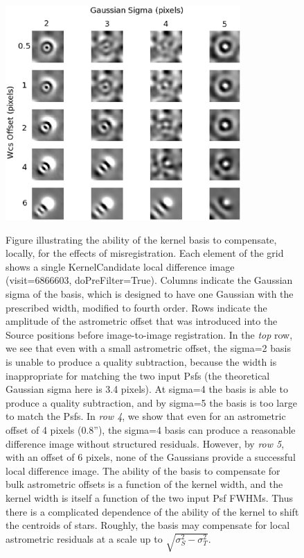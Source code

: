 \documentclass[prd, nofootinbib, floatfix, 11pt,tightenlines,times]{article}
\begin{document}
\begin{figure}
\includegraphics[width=0.8\textwidth]{figures/shift.eps} \\
\caption{Figure illustrating the ability of the kernel basis to
  compensate, locally, for the effects of misregistration.  Each
  element of the grid shows a single KernelCandidate local difference
  image (visit=6866603, doPreFilter=True).  Columns indicate the
  Gaussian sigma of the basis, which is designed to have one Gaussian
  with the prescribed width, modified to fourth order.  Rows indicate
  the amplitude of the astrometric offset that was introduced into
  the Source positions before image-to-image registration.  
  In the {\it top} row, we see that even with a small astrometric
  offset, the sigma=2 basis is unable to produce a quality
  subtraction, because the width is inappropriate for matching the two
  input Psfs (the theoretical Gaussian sigma here is 3.4 pixels).  At
  sigma=4 the basis is able to produce a quality subtraction, and by
  sigma=5 the basis is too large to match the Psfs.  In {\it row 4},
  we show that even for an astrometric offset of 4 pixels (0.8''), the
  sigma=4 basis can produce a reasonable difference image without
  structured residuals.  However, by {\it row 5}, with an offset of 6
  pixels, none of the Gaussians provide a successful local difference
  image. 
  The ability of the basis to compensate for bulk astrometric offsets
  is a function of the kernel width, and the kernel width is itself a
  function of the two input Psf FWHMs.  Thus there is a complicated
  dependence of the ability of the kernel to shift the centroids of
  stars.  Roughly, the basis may compensate for local astrometric residuals
  at a scale up to $\sqrt{\sigma_S^2 - \sigma_T^2}$.
}
\label{kernel_offsets}
\end{figure}
\end{document}
